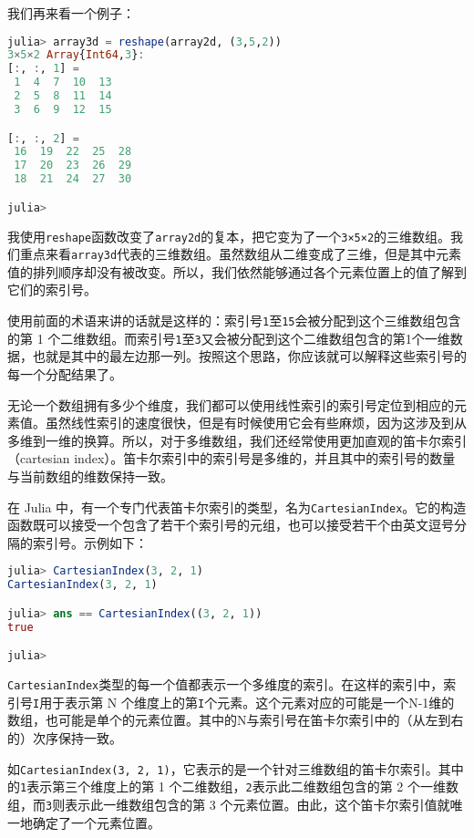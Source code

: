 我们再来看一个例子：

\begin{lstlisting}[language=julia]
julia> array3d = reshape(array2d, (3,5,2))
3×5×2 Array{Int64,3}:
[:, :, 1] =
 1  4  7  10  13
 2  5  8  11  14
 3  6  9  12  15

[:, :, 2] =
 16  19  22  25  28
 17  20  23  26  29
 18  21  24  27  30

julia> 
\end{lstlisting}

我使用\verb|reshape|函数改变了\verb|array2d|的复本，把它变为了一个\verb|3×5×2|的三维数组。我们重点来看\verb|array3d|代表的三维数组。虽然数组从二维变成了三维，但是其中元素值的排列顺序却没有被改变。所以，我们依然能够通过各个元素位置上的值了解到它们的索引号。

使用前面的术语来讲的话就是这样的：索引号\verb|1|至\verb|15|会被分配到这个三维数组包含的第 1 个二维数组。而索引号\verb|1|至\verb|3|又会被分配到这个二维数组包含的第1个一维数据，也就是其中的最左边那一列。按照这个思路，你应该就可以解释这些索引号的每一个分配结果了。

无论一个数组拥有多少个维度，我们都可以使用线性索引的索引号定位到相应的元素值。虽然线性索引的速度很快，但是有时候使用它会有些麻烦，因为这涉及到从多维到一维的换算。所以，对于多维数组，我们还经常使用更加直观的笛卡尔索引（cartesian index）。笛卡尔索引中的索引号是多维的，并且其中的索引号的数量与当前数组的维数保持一致。

在 Julia 中，有一个专门代表笛卡尔索引的类型，名为\verb|CartesianIndex|。它的构造函数既可以接受一个包含了若干个索引号的元组，也可以接受若干个由英文逗号分隔的索引号。示例如下：

\begin{lstlisting}[language=julia]
julia> CartesianIndex(3, 2, 1)
CartesianIndex(3, 2, 1)

julia> ans == CartesianIndex((3, 2, 1))
true

julia> 
\end{lstlisting}

\verb|CartesianIndex|类型的每一个值都表示一个多维度的索引。在这样的索引中，索引号\verb|I|用于表示第 N 个维度上的第\verb|I|个元素。这个元素对应的可能是一个N-1维的数组，也可能是单个的元素位置。其中的N与索引号在笛卡尔索引中的（从左到右的）次序保持一致。

如\verb|CartesianIndex(3, 2, 1)|，它表示的是一个针对三维数组的笛卡尔索引。其中的\verb|1|表示第三个维度上的第 1 个二维数组，\verb|2|表示此二维数组包含的第 2 个一维数组，而\verb|3|则表示此一维数组包含的第 3 个元素位置。由此，这个笛卡尔索引值就唯一地确定了一个元素位置。

